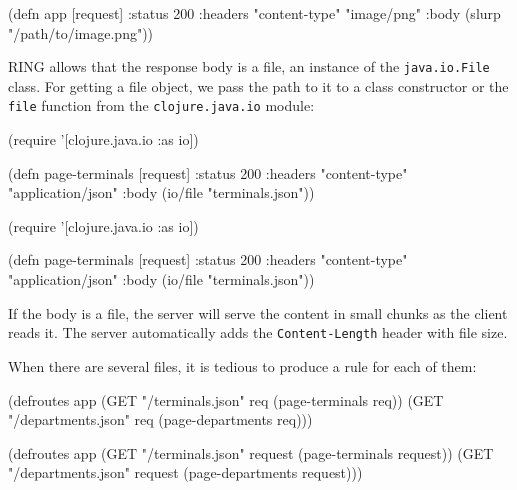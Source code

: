 \begin{clojure}
(defn app [request]
  {:status 200
   :headers {"content-type" "image/png"}
   :body (slurp "/path/to/image.png")})
\end{clojure}


RING allows that the response body is a file, an instance of the \verb|java.io.File| class. For getting a file object, we pass the path to it to a class constructor or the \verb|file| function from the \verb|clojure.java.io| module:

\ifx\DEVICETYPE\MOBILE

\begin{clojure}
(require '[clojure.java.io :as io])

(defn page-terminals
  [request]
  {:status 200
   :headers
   {"content-type" "application/json"}
   :body (io/file "terminals.json")})
\end{clojure}

\else

\begin{clojure}
(require '[clojure.java.io :as io])

(defn page-terminals
  [request]
  {:status 200
   :headers {"content-type" "application/json"}
   :body (io/file "terminals.json")})
\end{clojure}

\fi


If the body is a file, the server will serve the content in small chunks as the client reads it. The server automatically adds the \verb|Content-Length| header with file size.

When there are several files, it is tedious to produce a rule for each of them:

\ifx\DEVICETYPE\MOBILE

\begin{clojure}
(defroutes app
  (GET "/terminals.json"
       req (page-terminals req))
  (GET "/departments.json"
       req (page-departments req)))
\end{clojure}

\else

\begin{clojure}
(defroutes app
  (GET "/terminals.json"   request (page-terminals request))
  (GET "/departments.json" request (page-departments request)))
\end{clojure}

